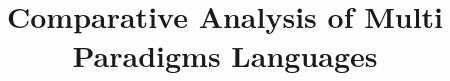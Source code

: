 \documentclass{sig-alternate}
\begin{document}
	
	\title{Comparative Analysis of Multi Paradigms Languages}
	
	
\end{document}
